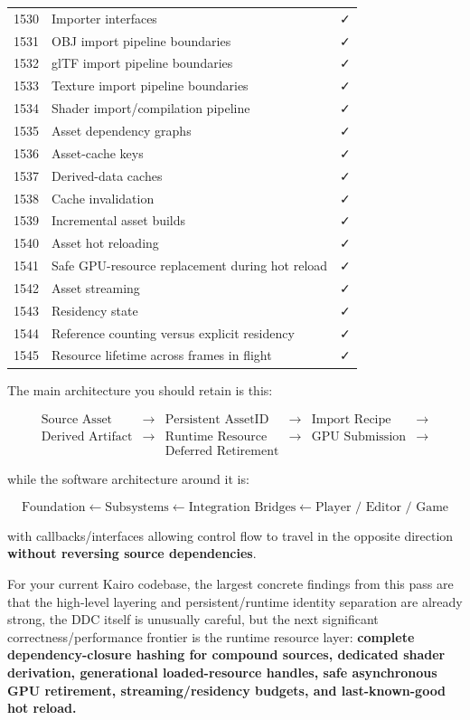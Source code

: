 {\begin{longtable}[]{@{}rll@{}}
1530 & Importer interfaces & ✓ \\
1531 & OBJ import pipeline boundaries & ✓ \\
1532 & glTF import pipeline boundaries & ✓ \\
1533 & Texture import pipeline boundaries & ✓ \\
1534 & Shader import/compilation pipeline & ✓ \\
1535 & Asset dependency graphs & ✓ \\
1536 & Asset-cache keys & ✓ \\
1537 & Derived-data caches & ✓ \\
1538 & Cache invalidation & ✓ \\
1539 & Incremental asset builds & ✓ \\
1540 & Asset hot reloading & ✓ \\
1541 & Safe GPU-resource replacement during hot reload & ✓ \\
1542 & Asset streaming & ✓ \\
1543 & Residency state & ✓ \\
1544 & Reference counting versus explicit residency & ✓ \\
1545 & Resource lifetime across frames in flight & ✓ \\
\end{longtable}
}

The main architecture you should retain is this:

\[
\boxed{
\begin{array}{cccccc}
\text{Source Asset}
&\rightarrow&
\text{Persistent AssetID}
&\rightarrow&
\text{Import Recipe}
&\rightarrow
\\[4pt]
\text{Derived Artifact}
&\rightarrow&
\text{Runtime Resource}
&\rightarrow&
\text{GPU Submission}
&\rightarrow
\\[4pt]
&&
\text{Deferred Retirement}
&&&
\end{array}
}
\]

while the software architecture around it is:

\[
\boxed{
\text{Foundation}
\leftarrow
\text{Subsystems}
\leftarrow
\text{Integration Bridges}
\leftarrow
\text{Player / Editor / Game}
}
\]

with callbacks/interfaces allowing control flow to travel in the opposite direction \textbf{without reversing source dependencies}.

For your current Kairo codebase, the largest concrete findings from this pass are that the high-level layering and persistent/runtime identity separation are already strong, the DDC itself is unusually careful, but the next significant correctness/performance frontier is the runtime resource layer: \textbf{complete dependency-closure hashing for compound sources, dedicated shader derivation, generational loaded-resource handles, safe asynchronous GPU retirement, streaming/residency budgets, and last-known-good hot reload.}

